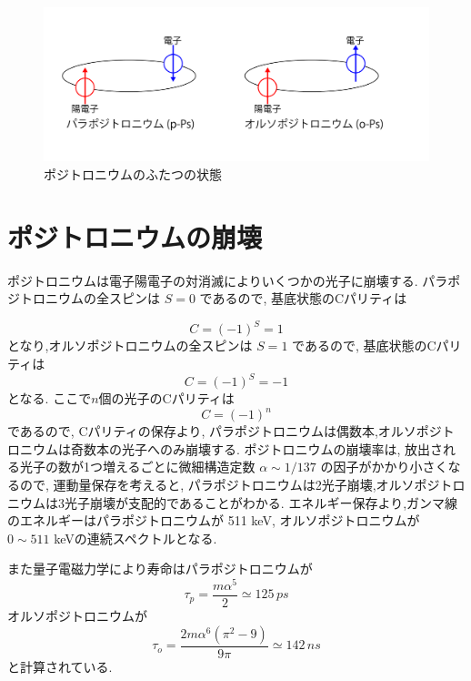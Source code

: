 \begin{figure}[H]
\centering
\includegraphics[keepaspectratio, scale=0.4]{fig/ybm/Ps.pdf}
\caption{ポジトロニウムのふたつの状態}
\label{fig:Ps}
\end{figure}


\section{ポジトロニウムの崩壊}

ポジトロニウムは電子陽電子の対消滅によりいくつかの光子に崩壊する.
パラポジトロニウムの全スピンは $S=0$ であるので,
基底状態のCパリティは

\begin{equation}
	\nonumber
C = (-1)^{S} = 1
\end{equation}
となり,オルソポジトロニウムの全スピンは $S=1$ であるので,
基底状態のCパリティは
\begin{equation}
	\nonumber
C = (-1)^{S} = -1
\end{equation}
となる.
ここで$n$個の光子のCパリティは
\begin{equation}
	\nonumber
C = (-1)^{n}
\end{equation}
であるので,
Cパリティの保存より,
パラポジトロニウムは偶数本,オルソポジトロニウムは奇数本の光子へのみ崩壊する.
ポジトロニウムの崩壊率は,
放出される光子の数が1つ増えるごとに微細構造定数 $\alpha \sim 1/137$ の因子がかかり小さくなるので,
運動量保存を考えると,
パラポジトロニウムは2光子崩壊,オルソポジトロニウムは3光子崩壊が支配的であることがわかる.
エネルギー保存より,ガンマ線のエネルギーはパラポジトロニウムが 511 keV,
オルソポジトロニウムが $0 \sim 511$  keVの連続スペクトルとなる.

また量子電磁力学により寿命はパラポジトロニウムが
\begin{equation}
	\nonumber
\tau_{p} = \frac{m \alpha^{5}}{2} \simeq 125 \, \si{ps}
\end{equation}
オルソポジトロニウムが
\begin{equation}
	\nonumber
\tau_{o} = \frac{2m \alpha^{6}(\pi^{2}-9)}{9 \pi} \simeq 142 \, \si{ns}
\end{equation}
と計算されている.


